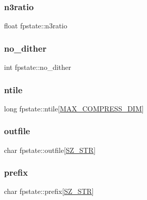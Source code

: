 \subsubsection{\texorpdfstring{n3ratio}{n3ratio}}
{\footnotesize\ttfamily float fpstate\+::n3ratio}

\mbox{\label{structfpstate_a35674057cfdddee64ae8a02dfdd1e7be}} 
\subsubsection{\texorpdfstring{no\+\_\+dither}{no\_dither}}
{\footnotesize\ttfamily int fpstate\+::no\+\_\+dither}

\mbox{\label{structfpstate_a0e898d11a9484eb22c607c15bf17c30f}} 
\subsubsection{\texorpdfstring{ntile}{ntile}}
{\footnotesize\ttfamily long fpstate\+::ntile\mbox{[}\hyperlink{fitsio_8h_a490098c3c66339cb8e66ec352707f0d4}{M\+A\+X\+\_\+\+C\+O\+M\+P\+R\+E\+S\+S\+\_\+\+D\+IM}\mbox{]}}

\mbox{\label{structfpstate_aafd3cf561870e0cb4240b9e3dd7a0f61}} 
\subsubsection{\texorpdfstring{outfile}{outfile}}
{\footnotesize\ttfamily char fpstate\+::outfile\mbox{[}\hyperlink{fpack_8h_a4ad6b27302c290b31000b9d7b537959c}{S\+Z\+\_\+\+S\+TR}\mbox{]}}

\mbox{\label{structfpstate_a54656a3b2380f099b7fdf8ab3e79f4ad}} 
\subsubsection{\texorpdfstring{prefix}{prefix}}
{\footnotesize\ttfamily char fpstate\+::prefix\mbox{[}\hyperlink{fpack_8h_a4ad6b27302c290b31000b9d7b537959c}{S\+Z\+\_\+\+S\+TR}\mbox{]}}

